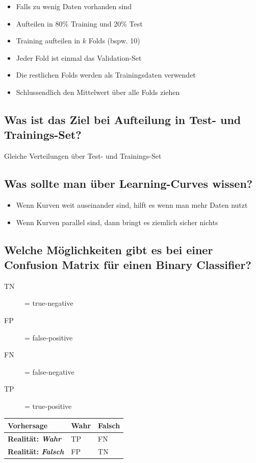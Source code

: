 \documentclass[a4paper]{article}
\begin{document}
		\begin{itemize}
			\item Falls zu wenig Daten vorhanden sind
			\item Aufteilen in 80\% Training und 20\% Test
			\item Training aufteilen in $k$ Folds (bspw. 10)
			\item Jeder Fold ist einmal das Validation-Set
			\item Die restlichen Folds werden als Trainingsdaten verwendet
			\item Schlussendlich den Mittelwert über alle Folds ziehen
		\end{itemize}
	
		\subsection{Was ist das Ziel bei Aufteilung in Test- und Trainings-Set?}
		
		Gleiche Verteilungen über Test- und Trainings-Set
		
		\subsection{Was sollte man über Learning-Curves wissen?}
		
		\begin{itemize}
			\item Wenn Kurven weit auseinander sind, hilft es wenn man mehr Daten nutzt
			\item Wenn Kurven parallel sind, dann bringt es ziemlich sicher nichts
		\end{itemize}
	
	\newpage
	
		\subsection{Welche Möglichkeiten gibt es bei einer Confusion Matrix für einen Binary Classifier?}
		
		\begin{description}
			\item[TN] = true-negative
			\item[FP] = false-positive
			\item[FN] = false-negative
			\item[TP] = true-positive
		\end{description}
	
		\begin{table}[]
			\begin{tabular}{|l|l|l|}
				\hline
				\textbf{Vorhersage}       & \textbf{Wahr} & \textbf{Falsch} \\ \hline
				\textbf{Realität: \textit{Wahr}}   & TP            & FN              \\ \hline
				\textbf{Realität: \textit{Falsch}} & FP            & TN              \\ \hline
			\end{tabular}
		\end{table}
	
\end{document}
